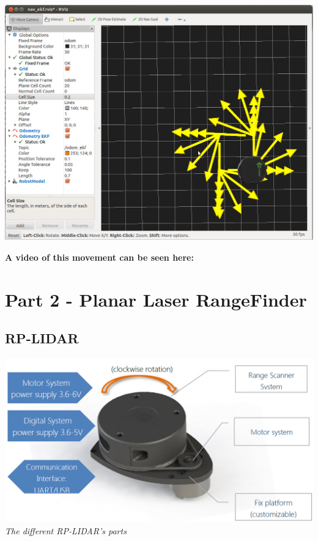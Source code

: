 \documentclass[10pt,a4paper]{article}
\begin{document}
\begin{center}
\includegraphics[width=\textwidth]{images/move_base_square.jpg}\\
\end{center}

\textbf{A video of this movement can be seen here:}\\

\section{Part 2 - Planar Laser RangeFinder}

\subsection{RP-LIDAR}

\begin{center}
\includegraphics[scale=0.4]{images/lidarParts.png}\\
\textit{The different RP-LIDAR's parts}
\end{center}
\end{document}
